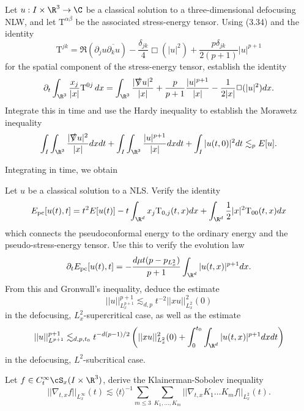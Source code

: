 \begin{statement}
	Let $u: I \times \R^3 \to \C$ be a classical solution to a three-dimensional defocusing NLW, and let $\text{T}^{\alpha \beta}$ be the associated stress-energy tensor. Using (3.34) and the identity
		\[ \text{T}^{jk} = \Re (\partial_j u \overline{\partial_k u}) - \frac{\delta_{jk}}{4} \Box (|u|^2) + \frac{p \delta_{jk}}{2 (p + 1)} |u|^{p + 1} \]
	for the spatial component of the stress-energy tensor, establish the identity
		\[ \partial_t \int_{\R^3} \frac{x_j}{|x|} \text{T}^{0j} \, dx = \int_{\R^3} \frac{|\slashed \nabla u|^2}{|x|} + \frac{p}{p + 1} \frac{|u|^{p + 1}}{|x|} - \frac{1}{2|x|} \Box (|u|^2) dx. \]
	Integrate this in time and use the Hardy inequality to establish the Morawetz inequality
		\[ \int_I \int_{\R^3} \frac{|\slashed \nabla u|^2}{|x|} dx dt + \int_I \int_{\R^3} \frac{|u|^{p + 1}}{|x|} dx dt + \int_I |u(t, 0)|^2 dt \lesssim_p E[u]. \]		
\end{statement}

\begin{solution}
	Integrating in time, we obtain
\end{solution}

\begin{statement}
	Let $u$ be a classical solution to a NLS. Verify the identity
		\[ E_{\text{pc}} [u(t), t] = t^2 E[u(t)] - t \int_{\R^d} x_j \text{T}_{0, j} (t, x) dx + \int_{\R^d} \frac12 |x|^2 \text{T}_{00} (t, x) dx \]
	which connects the pseudoconformal energy to the ordinary energy and the pseudo-stress-energy tensor. Use this to verify the evolution law
		\[ \partial_t E_{\text{pc}} [u(t), t] = - \frac{d \mu t(p - p_{L^2_x})}{p +1} \int_{\R^d} |u(t, x)|^{p + 1} dx. \]
	From this and Gronwall's inequality, deduce the estimate
		\[ ||u||_{L^{p + 1}_x}^{p + 1} \lesssim_{d, p} t^{-2} ||x u||_{L^2_x}^2 (0) \]
	in the defocusing, $L^2_x$-supercritical case, as well as the estimate
		\[ ||u||_{L^{p + 1}}^{p + 1} \lesssim_{d, p, t_0} t^{-d (p - 1)/2} \left( ||x u||_{L^2_x}^2 (0) + \int_0^{t_0} \int_{\R^d} |u(t, x)|^{p + 1} dx dt \right)\]
	in the defocusing, $L^2$-subcritical case. 				
\end{statement}

\begin{solution}
	
\end{solution}

\begin{statement}
	Let $f \in C^\infty_t \cS_x (I \times \R^3)$, derive the Klainerman-Sobolev inequality
		\[ ||\nabla_{t, x} f||_{L^\infty_x}(t) \lesssim \langle t \rangle^{-1} \sum_{m \leq 3} \sum_{K_1, \dots, K_m}||\nabla_{t, x} K_1 \dots K_m f||_{L^2_x} (t). \]
\end{statement}

